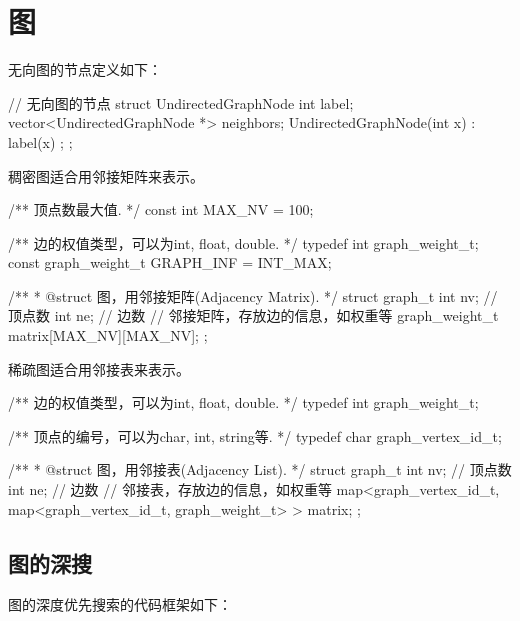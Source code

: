 \chapter{图}
无向图的节点定义如下：
\begin{Code}
	// 无向图的节点
	struct UndirectedGraphNode {
		int label;
		vector<UndirectedGraphNode *> neighbors;
		UndirectedGraphNode(int x) : label(x) {};
	};
\end{Code}

稠密图适合用邻接矩阵来表示。
\begin{Codex}[label=am_graph.cpp]
/** 顶点数最大值. */
const int MAX_NV = 100;

/** 边的权值类型，可以为int, float, double. */
typedef int graph_weight_t;
const graph_weight_t GRAPH_INF = INT_MAX;

/**
 * @struct 图，用邻接矩阵(Adjacency Matrix).
 */
struct graph_t {
    int nv; // 顶点数
    int ne; // 边数
    // 邻接矩阵，存放边的信息，如权重等
    graph_weight_t matrix[MAX_NV][MAX_NV];
};
\end{Codex}

稀疏图适合用邻接表来表示。
\begin{Codex}[label=al_graph.cpp]
/** 边的权值类型，可以为int, float, double. */
typedef int graph_weight_t;

/** 顶点的编号，可以为char, int, string等. */
typedef char graph_vertex_id_t;

/**
 * @struct 图，用邻接表(Adjacency List).
 */
struct graph_t {
    int nv; // 顶点数
    int ne; // 边数
    // 邻接表，存放边的信息，如权重等
    map<graph_vertex_id_t, map<graph_vertex_id_t, graph_weight_t> > matrix;
};
\end{Codex}


\section{图的深搜} %

图的深度优先搜索的代码框架如下：

